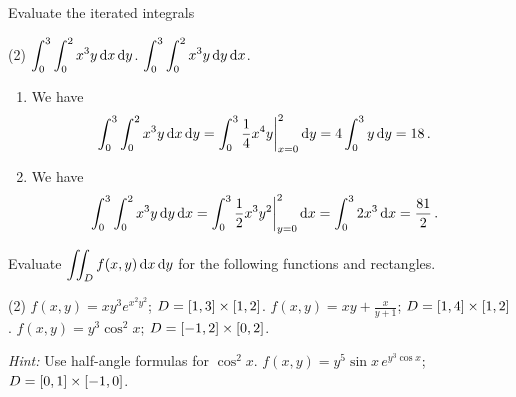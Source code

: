\begin{question}
Evaluate the iterated integrals
\begin{tasks}(2)
\task
$\displaystyle \int_0^3 \int_0^2 x^3 y \,\mathrm{d} x \,\mathrm{d} y$.
\task
$\displaystyle \int_0^3 \int_0^2 x^3 y \,\mathrm{d} y \,\mathrm{d} x$.
\end{tasks}
\end{question}

\begin{solution}
\begin{enumerate}
\item
We have
\begin{align*}
\int_0^3 \int_0^2 x^3 y \,\mathrm{d} x \,\mathrm{d} y
&= \int_0^3 \frac 14 x^4 y \bigg|_{x=0}^2 \,\mathrm{d} y
= 4 \int_0^3 y \,\mathrm{d} y = 18\,.
\end{align*}

\item
We have
\begin{align*}
\int_0^3 \int_0^2 x^3 y \,\mathrm{d} y \,\mathrm{d} x
&= \int_0^3 \frac 12 x^3 y^2 \bigg|_{y=0}^2 \,\mathrm{d} x
= \int_0^3 2 x^3 \,\mathrm{d} x = \frac{81}{2} \,.
\end{align*}
\end{enumerate}
\end{solution}

\begin{question}
Evaluate $\displaystyle\iint_{D} f(x,y) \,\mathrm{d} x \,\mathrm{d} y$ for the following functions and rectangles.
\begin{tasks}(2)
\task
$f(x,y) = xy^3 e^{x^2 y^2}$; $D=[1,3] \times [1,2]$.
\task
$\displaystyle f(x,y) = xy + \frac{x}{y+1}$; $D=[1,4]\times [1,2]$.
\task
$\displaystyle f(x,y) = y^3 \cos^2 x$; $D=[-1,2]\times [0,2]$.

{\itshape Hint:} Use half-angle formulas for $\cos^2 x$.
\task
$\displaystyle f(x,y) = y^5 \sin x\, e^{y^3 \cos x}$; $D=[0,1]\times [-1,0]$.
\end{tasks}
\end{question}

